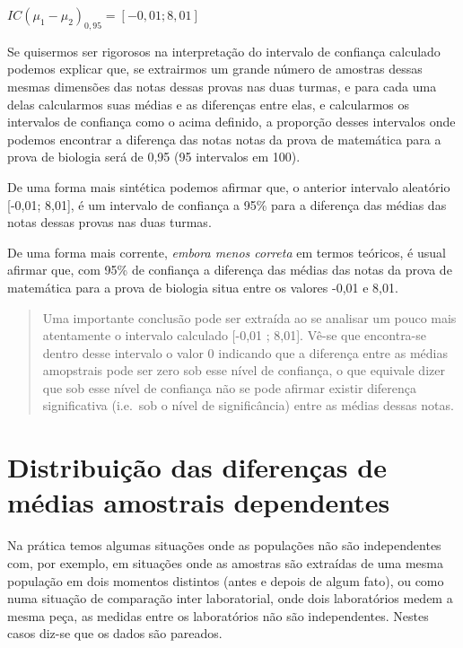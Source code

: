 \documentclass[
]{book}
\begin{document}
\hfill\break

\(IC (\mu_{1} - \mu_{2})_{0,95} = [-0,01 ; 8,01]\)

\hfill\break

Se quisermos ser rigorosos na interpretação do intervalo de confiança calculado podemos explicar que, se extrairmos um grande número de amostras dessas mesmas dimensões das notas dessas provas nas duas turmas, e para cada uma delas calcularmos suas médias e as diferenças entre elas, e calcularmos os intervalos de confiança como o acima definido, a proporção desses intervalos onde podemos encontrar a diferença das notas notas da prova de matemática para a prova de biologia será de 0,95 (95 intervalos em 100).

\hfill\break

De uma forma mais sintética podemos afirmar que, o anterior intervalo aleatório {[}-0,01; 8,01{]}, é um intervalo de confiança a 95\% para a diferença das médias das notas dessas provas nas duas turmas.

\hfill\break

De uma forma mais corrente, \emph{embora menos correta} em termos teóricos, é usual afirmar que, com 95\% de confiança a diferença das médias das notas da prova de matemática para a prova de biologia situa entre os valores -0,01 e 8,01.

\hfill\break

\begin{quote}
Uma importante conclusão pode ser extraída ao se analisar um pouco mais atentamente o intervalo calculado {[}-0,01 ; 8,01{]}. Vê-se que encontra-se dentro desse intervalo o valor 0 indicando que a diferença entre as médias amopstrais pode ser zero sob esse nível de confiança, o que equivale dizer que sob esse nível de confiança não se pode afirmar existir diferença significativa (i.e.~sob o nível de significância) entre as médias dessas notas.
\end{quote}

\hypertarget{distribuiuxe7uxe3o-das-diferenuxe7as-de-muxe9dias-amostrais-dependentes}{%
\section{Distribuição das diferenças de médias amostrais dependentes}\label{distribuiuxe7uxe3o-das-diferenuxe7as-de-muxe9dias-amostrais-dependentes}}

\hfill\break

Na prática temos algumas situações onde as populações não são independentes com, por exemplo, em situações onde as amostras são extraídas de uma mesma população em dois momentos distintos (antes e depois de algum fato), ou como numa situação de comparação inter laboratorial, onde dois laboratórios medem a mesma peça, as medidas entre os laboratórios não são independentes. Nestes casos diz-se que os dados são pareados.
\end{document}
